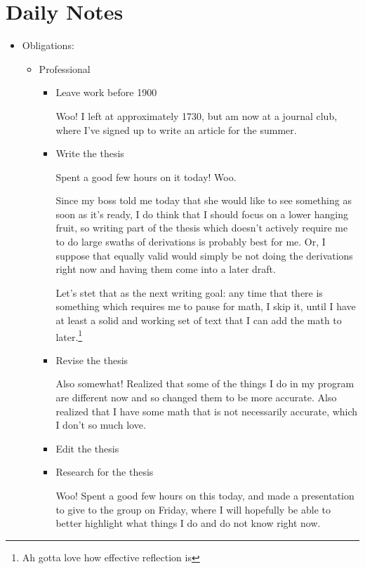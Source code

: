 \documentclass[12pt]{article}
\renewcommand{\,}{\textsuperscript{,}}
\begin{document}
\section{Daily Notes}

\begin{itemize}

\item Obligations:

\begin{itemize}

\item Professional

\begin{itemize}

\item Leave work before 1900

Woo! I left at approximately 1730, but am now at a journal club, where I've signed up to write an article for the summer.

\item Write the thesis

Spent a good few hours on it today! Woo.

Since my boss told me today that she would like to see something as soon as it's ready, I do think that I should focus on a lower hanging fruit, so writing part of the thesis which doesn't actively require me to do large swaths of derivations is probably best for me.  
Or, I suppose that equally valid would simply be not doing the derivations right now and having them come into a later draft.

Let's stet that as the next writing goal: any time that there is something which requires me to pause for math, I skip it, until I have at least a solid and working set of text that I can add the math to later.\footnote{Ah gotta love how effective reflection is}

\item Revise the thesis

Also somewhat! Realized that some of the things I do in my program are different now and so changed them to be more accurate. Also realized that I have some math that is not necessarily accurate, which I don't so much love.

\item Edit the thesis

\item Research for the thesis

Woo! Spent a good few hours on this today, and made a presentation to give to the group on Friday, where I will hopefully be able to better highlight what things I do and do not know right now.


\end{itemize}
\end{itemize}
\end{itemize}
\end{document}
